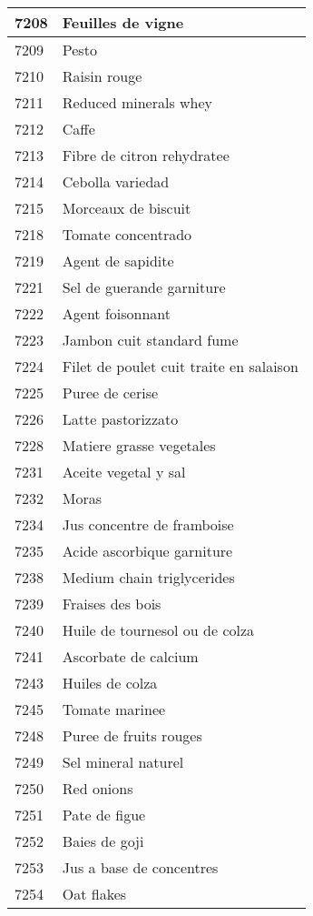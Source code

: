 \begin{longtable}{|l|l|}
7208 & Feuilles de vigne \\ \hline 
7209 & Pesto \\ \hline 
7210 & Raisin rouge \\ \hline 
7211 & Reduced minerals whey \\ \hline 
7212 & Caffe \\ \hline 
7213 & Fibre de citron rehydratee \\ \hline 
7214 & Cebolla variedad \\ \hline 
7215 & Morceaux de biscuit \\ \hline 
7218 & Tomate concentrado \\ \hline 
7219 & Agent de sapidite \\ \hline 
7221 & Sel de guerande garniture \\ \hline 
7222 & Agent foisonnant \\ \hline 
7223 & Jambon cuit standard fume \\ \hline 
7224 & Filet de poulet cuit traite en salaison \\ \hline 
7225 & Puree de cerise \\ \hline 
7226 & Latte pastorizzato \\ \hline 
7228 & Matiere grasse vegetales \\ \hline 
7231 & Aceite vegetal y sal \\ \hline 
7232 & Moras \\ \hline 
7234 & Jus concentre de framboise \\ \hline 
7235 & Acide ascorbique garniture \\ \hline 
7238 & Medium chain triglycerides \\ \hline 
7239 & Fraises des bois \\ \hline 
7240 & Huile de tournesol ou de colza \\ \hline 
7241 & Ascorbate de calcium \\ \hline 
7243 & Huiles de colza \\ \hline 
7245 & Tomate marinee \\ \hline 
7248 & Puree de fruits rouges \\ \hline 
7249 & Sel mineral naturel \\ \hline 
7250 & Red onions \\ \hline 
7251 & Pate de figue \\ \hline 
7252 & Baies de goji \\ \hline 
7253 & Jus a base de concentres \\ \hline 
7254 & Oat flakes \\ \hline 

\end{longtable}
